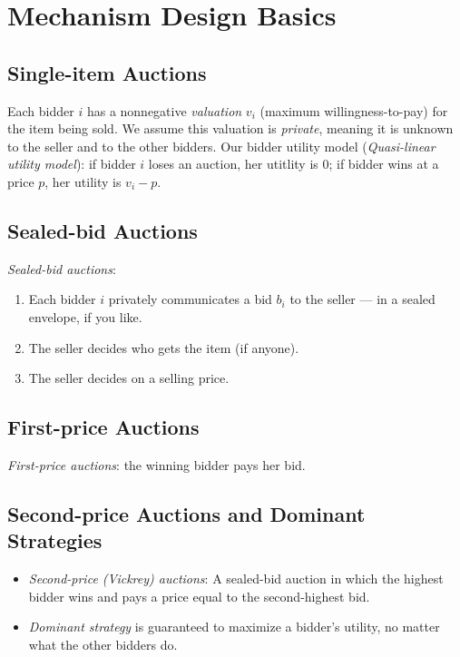 \documentclass[10pt]{article}
\theoremstyle{definition}
\begin{document}
\section{Mechanism Design Basics}

\subsection{Single-item Auctions}
Each bidder $i$ has a nonnegative \textit{valuation} $v_{i}$ (maximum willingness-to-pay) for the item being sold.
We assume this valuation is \textit{private}, meaning it is unknown to the seller and to the other bidders.
Our bidder utility model (\textit{Quasi-linear utility model}): if bidder $i$ loses an auction, her utitlity is $0$;
if bidder wins at a price $p$, her utility is $v_{i} - p$.

\subsection{Sealed-bid Auctions}
\textit{Sealed-bid auctions}:
\begin{enumerate}
	\item Each bidder $i$ privately communicates a bid $b_{i}$ to the seller — in a sealed envelope, if you like.
	\item The seller decides who gets the item (if anyone).
	\item The seller decides on a selling price.
\end{enumerate}


\subsection{First-price Auctions}
\textit{First-price auctions}: the winning bidder pays her bid.

\subsection{Second-price Auctions and Dominant Strategies}

\begin{itemize}
	\item \textit{Second-price (Vickrey) auctions}: A sealed-bid auction in which the highest bidder wins and pays a price equal
	      to the second-highest bid.
	\item \textit{Dominant strategy} is guaranteed to maximize a bidder's utility, no matter what the other bidders do.
\end{itemize}
\end{document}
